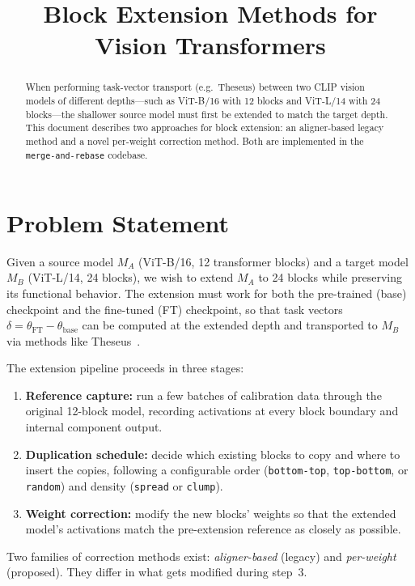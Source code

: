 \documentclass[11pt,a4paper]{article}
\title{Block Extension Methods for Vision Transformers}
\author{}
\date{}
\begin{document}
\maketitle

\begin{abstract}
When performing task-vector transport (e.g.\ Theseus) between two CLIP vision
models of different depths---such as ViT-B/16 with 12 blocks and ViT-L/14 with
24 blocks---the shallower source model must first be extended to match the
target depth. This document describes two approaches for block extension:
an aligner-based legacy method and a novel per-weight correction method.
Both are implemented in the \texttt{merge-and-rebase} codebase.
\end{abstract}

\section{Problem Statement}
\label{sec:intro}

Given a source model $M_A$ (ViT-B/16, 12 transformer blocks) and a target
model $M_B$ (ViT-L/14, 24 blocks), we wish to extend $M_A$ to 24 blocks
while preserving its functional behavior. The extension must work for both
the pre-trained (base) checkpoint and the fine-tuned (FT) checkpoint, so that
task vectors $\delta = \theta_{\text{FT}} - \theta_{\text{base}}$ can be
computed at the extended depth and transported to $M_B$ via methods like
Theseus~\cite{theseus}.

The extension pipeline proceeds in three stages:
\begin{enumerate}
    \item \textbf{Reference capture:} run a few batches of calibration data
          through the original 12-block model, recording activations at every
          block boundary and internal component output.
    \item \textbf{Duplication schedule:} decide which existing blocks to copy
          and where to insert the copies, following a configurable order
          (\texttt{bottom-top}, \texttt{top-bottom}, or \texttt{random}) and
          density (\texttt{spread} or \texttt{clump}).
    \item \textbf{Weight correction:} modify the new blocks' weights so that
          the extended model's activations match the pre-extension reference
          as closely as possible.
\end{enumerate}

Two families of correction methods exist: \emph{aligner-based} (legacy) and
\emph{per-weight} (proposed). They differ in what gets modified during step~3.
\end{document}
